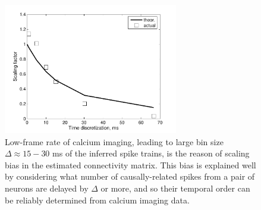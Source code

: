 \begin{figure}[h]
\centering
\includegraphics[width=3in]{../figs/FigureA4_scale_bias}
\caption{Low-frame rate of calcium imaging, leading to large bin size $\Delta\approx 15-30$ ms of the inferred spike trains, is the reason of scaling bias in the estimated connectivity matrix.
This bias is explained well by considering what number of causally-related spikes from
a pair of neurons are delayed by $\Delta$ or more, and so their temporal order can be reliably determined from calcium imaging data.}
\label{fig:bias}
\end{figure}

